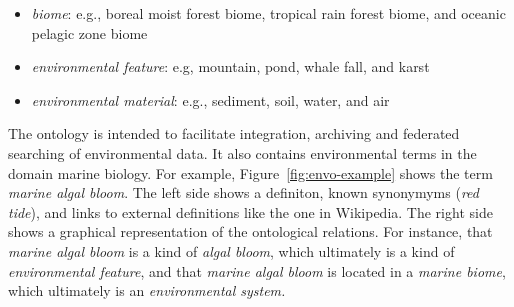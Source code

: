 \begin{itemize}
\item \emph{biome}: e.g., boreal moist forest biome, tropical rain forest biome, and oceanic pelagic zone biome 
\item \emph{environmental feature}: e.g, mountain, pond, whale fall, and karst
\item \emph{environmental material}: e.g., sediment, soil, water, and air
\end{itemize}

\noindent The ontology is intended to facilitate integration, archiving and federated searching of environmental data.
It also contains environmental terms in the domain marine biology.
For example, Figure~\ref{fig:envo-example} shows the term \emph{marine algal bloom}.
The left side shows a definiton, known synonymyms (\emph{red tide}), and links to external definitions like the one in Wikipedia.
The right side shows a graphical representation of the ontological relations.
For instance, that \emph{marine algal bloom} is a kind of \emph{algal bloom}, which ultimately is a kind of \emph{environmental feature}, and that  \emph{marine algal bloom} is located in a\emph{ marine biome}, which ultimately is an \emph{environmental system.}

